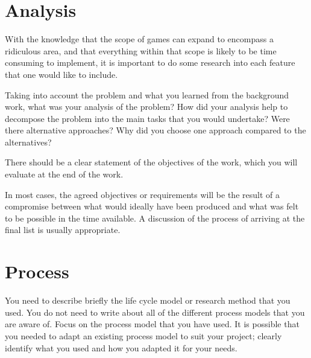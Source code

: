 \section{Analysis}
With the knowledge that the scope of games can expand to encompass a ridiculous area, and that everything within that scope is likely to be time consuming to implement, it is important to do some research into each feature that one would like to include.

Taking into account the problem and what you learned from the background work, what was your analysis of the problem? How did your analysis help to decompose the problem into the main tasks that you would undertake? Were there alternative approaches? Why did you choose one approach compared to the alternatives?

There should be a clear statement of the objectives of the work, which you will evaluate at the end of the work.

In most cases, the agreed objectives or requirements will be the result of a compromise between what would ideally have been produced and what was felt to be possible in the time available. A discussion of the process of arriving at the final list is usually appropriate.


\section{Process}
You need to describe briefly the life cycle model or research method that you used. You do not need to write about all of the different process models that you are aware of. Focus on the process model that you have used. It is possible that you needed to adapt an existing process model to suit your project; clearly identify what you used and how you adapted it for your needs.

